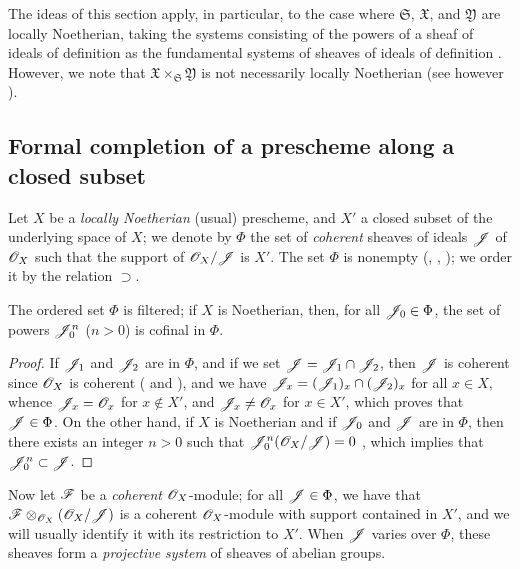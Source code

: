 \begin{env}[10.7.4]
The ideas of this section apply, in particular, to the case where $\mathfrak{S}$, $\mathfrak{X}$, and $\mathfrak{Y}$ are locally Noetherian, taking the systems consisting of the powers of a sheaf of ideals of definition  as the fundamental systems of sheaves of ideals of definition .
However, we note that $\mathfrak{X}\times_\mathfrak{S}\mathfrak{Y}$ is not necessarily locally Noetherian (see however ).
\end{env}

\subsection{Formal completion of a prescheme along a closed subset}
\label{subsection:I.10.8}

\begin{env}[10.8.1]
\label{I.10.8.1}
Let $X$ be a \emph{locally Noetherian} (usual) prescheme, and $X'$ a closed subset of the underlying space of $X$; we denote by $\Phi$ the set of \emph{coherent} sheaves of ideals $\mathscr{J}$ of $\mathscr{O}_X$ such that the support of $\mathscr{O}_X/\mathscr{J}$ is $X'$.
The set $\Phi$ is nonempty (, , ); we order it by the relation $\supset$.
\end{env}

\begin{lemma}[10.8.2]
\label{I.10.8.2}
The ordered set $\Phi$ is filtered; if $X$ is Noetherian, then, for all $\mathscr{J}_0\in\Phi$, the set of powers $\mathscr{J}_0^n$ ($n>0$) is cofinal in $\Phi$.
\end{lemma}

\begin{proof}
If $\mathscr{J}_1$ and $\mathscr{J}_2$ are in $\Phi$, and if we set $\mathscr{J}=\mathscr{J}_1\cap\mathscr{J}_2$, then $\mathscr{J}$ is coherent since $\mathscr{O}_X$ is coherent ( and ), and we have $\mathscr{J}_x=(\mathscr{J}_1)_x\cap(\mathscr{J}_2)_x$ for all $x\in X$, whence $\mathscr{J}_x=\mathscr{O}_x$ for $x\not\in X'$, and $\mathscr{J}_x\neq\mathscr{O}_x$ for $x\in X'$, which proves that $\mathscr{J}\in\Phi$.
On the other hand, if $X$ is Noetherian and if $\mathscr{J}_0$ and $\mathscr{J}$ are in $\Phi$, then there exists an integer $n>0$ such that $\mathscr{J}_0^n(\mathscr{O}_X/\mathscr{J})=0$ , which implies that $\mathscr{J}_0^n\subset\mathscr{J}$.
\end{proof}

\begin{env}[10.8.3]
\label{I.10.8.3}
Now let $\mathscr{F}$ be a \emph{coherent} $\mathscr{O}_X$-module; for all $\mathscr{J}\in\Phi$, we have that $\mathscr{F}\otimes_{\mathscr{O}_X}(\mathscr{O}_X/\mathscr{J})$ is a coherent $\mathscr{O}_X$-module  with support contained in $X'$, and we will usually identify it with its restriction to $X'$.
When $\mathscr{J}$ varies over $\Phi$, these sheaves form a \emph{projective system} of sheaves of abelian groups.
\end{env}

